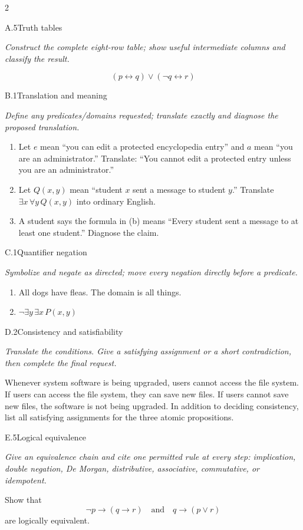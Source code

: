\documentclass[9pt]{extarticle}
\begin{document}
\begin{multicols}{2}
\begin{CoreProblem}{A.5}{Truth tables}
{\scriptsize\textit{Construct the complete eight-row table; show useful intermediate columns and classify the result.}\par}
\[
  (p\leftrightarrow q)\lor(\neg q\leftrightarrow r)
\]
\end{CoreProblem}
\begin{CoreProblem}{B.1}{Translation and meaning}
{\scriptsize\textit{Define any predicates/domains requested; translate exactly and diagnose the proposed translation.}\par}
\begin{enumerate}[label=(\alph*)]
  \item Let $e$ mean ``you can edit a protected encyclopedia entry'' and $a$
        mean ``you are an administrator.'' Translate: ``You cannot edit a
        protected entry unless you are an administrator.''
  \item Let $Q(x,y)$ mean ``student $x$ sent a message to student $y$.''
        Translate $\exists x\,\forall y\,Q(x,y)$ into ordinary English.
  \item A student says the formula in (b) means ``Every student sent a message
        to at least one student.'' Diagnose the claim.
\end{enumerate}
\end{CoreProblem}
\begin{CoreProblem}{C.1}{Quantifier negation}
{\scriptsize\textit{Symbolize and negate as directed; move every negation directly before a predicate.}\par}
\begin{enumerate}[label=(\alph*)]
  \item All dogs have fleas. The domain is all things.
  \item $\neg\exists y\,\exists x\,P(x,y)$
\end{enumerate}
\end{CoreProblem}
\columnbreak
\begin{CoreProblem}{D.2}{Consistency and satisfiability}
{\scriptsize\textit{Translate the conditions. Give a satisfying assignment or a short contradiction, then complete the final request.}\par}
Whenever system software is being upgraded, users cannot access the file
system. If users can access the file system, they can save new files. If users
cannot save new files, the software is not being upgraded. In addition to
deciding consistency, list all satisfying assignments for the three atomic
propositions.
\end{CoreProblem}
\begin{CoreProblem}{E.5}{Logical equivalence}
{\scriptsize\textit{Give an equivalence chain and cite one permitted rule at every step: implication, double negation, De Morgan, distributive, associative, commutative, or idempotent.}\par}
Show that
\[
  \neg p\to(q\to r)
  \quad\text{and}\quad
  q\to(p\lor r)
\]
are logically equivalent.
\end{CoreProblem}
\end{multicols}
\end{document}
